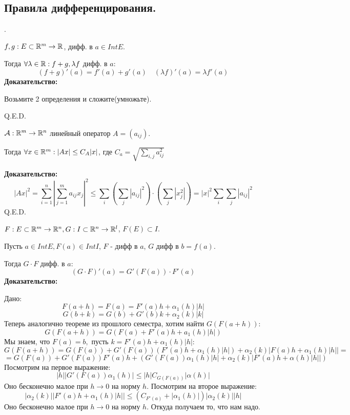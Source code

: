\subsection{Правила дифференцирования.}

 .

$f,g: E \subset \mathbb{R}^m \rightarrow \mathbb{R}$, дифф. в $a \in Int E$.

Тогда $\forall \lambda \in \mathbb{R}: f+g, \lambda f$ дифф. в $a$:
$$(f+g)'(a) = f'(a)+ g'(a)\quad (\lambda f)'(a) = \lambda f'(a)$$
\textbf{Доказательство:}

Возьмите 2 определения и сложите(умножьте).

\hfill Q.E.D.

 


$\mathcal{A}: \mathbb{R}^m \rightarrow \mathbb{R}^n$ линейный оператор $A = (a_{ij})$.

Тогда $\forall x \in \mathbb{R}^m : |Ax|\leq C_A|x|$, где $C_a = \sqrt{\sum\limits_{i,j}a_{ij}^2}$

\textbf{Доказательство:}
$$|Ax|^2 = \sum\limits_{i = 1}^n|\sum\limits_{j=1}^ma_{ij}x_j|^2\leq \sum\limits_{i} (\sum\limits_{j}|a_{ij}|^2)\cdot (\sum\limits_{j}|x_j^2|) = |x|^2\sum\limits_{i}\sum\limits_{j}|a_{ij}|^2 $$
\hfill Q.E.D.



$F: E\subset \mathbb{R}^m \rightarrow \mathbb{R}^n, G:I \subset \mathbb{R}^n \rightarrow \mathbb{R}^l$, $F(E)\subset I$. 

Пусть $a \in Int E, F(a)\in Int I$, $F$ - дифф в $a$, $G$ дифф в $b = f(a)$.

Тогда $G\cdot F$ дифф. в $a:$
$$(G\cdot F)'(a) = G'(F(a))\cdot F'(a)$$
\textbf{Доказательство:}

Дано:
$$F(a+h) = F(a) = F'(a)h + \alpha_1(h) |h|$$
$$G(b+k) = G(b) + G'(b)k + \alpha_2(k)|k| $$
Теперь аналогично теореме из прошлого семестра, хотим найти $G(F(a+h)):$
$$G(F(a+h)) = G(F(a) + F'(a)h + a_1(h)|h|)$$
Мы знаем, что $F(a) = b,$ пусть $k = F'(a)h+ \alpha_1(h)|h|$:
$$G(F(a+h)) = G(F(a)) + G'(F(a))(F'(a)h + \alpha_1(h)|h|) + \alpha_2(k) |F(a)h + \alpha_1(h)|h|| = $$
$$=G(F(a)) + G'(F(a)) F'(a)h + (G'(F(a))\alpha_1(h)|h| + \alpha_2(k)|F'(a)h + \alpha(h) |h||)$$
Посмотрим на первое выражение:
$$|h||G'(F(a))\alpha_1(h)| \leq |h| C_{G(F(a))}|\alpha(h)|$$
Оно бесконечно малое при $h \rightarrow 0$ на норму $h$. Посмотрим на второе выражение:
$$|\alpha_2(k)||F'(a)h + \alpha_1(h) |h|| \leq( C_{F'(a)}+ |\alpha_1(h)|) |\alpha_2(k)||h|$$
Оно бесконечно малое при $h \rightarrow 0$ на норму $h$. Откуда получаем то, что нам надо.

